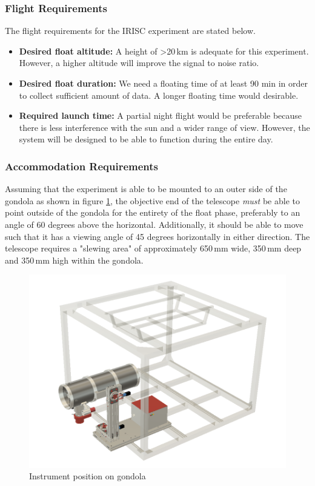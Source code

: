\subsubsection{Flight Requirements}
The flight requirements for the IRISC experiment are stated below.
\begin{itemize}
	\item \textbf{Desired float altitude:} A height of >20\,km is adequate for this experiment. However, a higher altitude will improve the signal to noise ratio.
	\item \textbf{Desired float duration:} We need a floating time of at least 90 min in order to collect sufficient amount of data. A longer floating time would desirable.
	\item \textbf{Required launch time:} A partial night flight would be preferable because there is less interference with the sun and a wider range of view. However, the system will be designed to be able to function during the entire day.
\end{itemize}

\subsubsection{Accommodation Requirements}

Assuming that the experiment is able to be mounted to an outer side of the gondola as shown in figure \ref{accomrec}, the objective end of the telescope \textit{must} be able to point outside of the gondola for the entirety of the float phase, preferably to an angle of 60 degrees above the horizontal. Additionally, it should be able to move such that it has a viewing angle of 45 degrees horizontally in either direction. The telescope requires a "slewing area" of approximately 650\,mm wide, 350\,mm deep and 350\,mm high within the gondola.

\begin{figure}[H]
	\centering
	\includegraphics[width=0.9\linewidth]{4-experiment-design/img/mechanical/ebox.png}
	\caption{Instrument position on gondola}
	\label{accomrec}
\end{figure}
